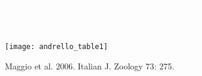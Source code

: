 \documentclass[t]{beamer}
\newcommand{\ccbysa}[1]{%
	\ifx&#1&
	{\textsc{cc by-sa}}%
\else
	{\textsc{cc by-sa #1.0}} 
\fi}
\begin{document}

{
\begin{frame}[b]{\textcolor{white}{\textit{Epinephelus marginatus}}}

\hfill \tiny \textcolor{white}{Parent Géry, Wikimedia, \ccbysa{3}}
\end{frame}
}

{
\begin{frame}[t]
\end{frame}
}

{
\begin{frame}[t]
\end{frame}
}

{
\begin{frame}[t]
\end{frame}
}


\begin{frame}[t]
	\begin{center}
		\texttt{[image: andrello\_table1]}
	\end{center}
\end{frame}

{
\begin{frame}[b]

\hfill \tiny Maggio et al. 2006. Italian J. Zoology 73: 275.
\end{frame}
}
\end{document}
